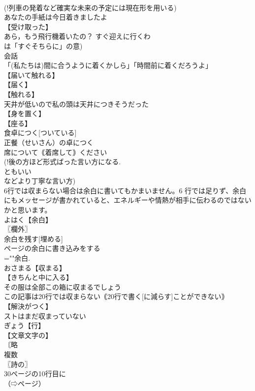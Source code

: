 \documentclass[8pt]{extreport}
\begin{document}
\begin{CJK}{UTF8}{min}
\\	(!列車の発着など確実な未来の予定には現在形を用いる) 
\\	あなたの手紙は今日着きましたよ
\\	【受け取った】
\\	あら，もう飛行機着いたの？ すぐ迎えに行くわ
\\	は「すぐそちらに」の意)
\\	会話
\\	「(私たちは)間に合うように着くかしら」「時間前に着くだろうよ」
\\	【届いて触れる】
\\	【届く】
\\	【触れる】
\\	天井が低いので私の頭は天井につきそうだった
\\	【身を置く】
\\	【座る】
\\	食卓につく[ついている]
\\	正餐（せいさん）の卓につく
\\	席について｟着席して｠ください
\\	(!後の方ほど形式ばった言い方になる. 
\\	ともいい 
\\	などより丁寧な言い方)
\\	6行では収まらない場合は余白に書いてもかまいません。6 行では足りず、余白にもメッセージが書かれていると、エネルギーや情熱が相手に伝わるのではないかと思います。		
\\	よはく【余白】
\\	〖欄外〗
\\	余白を残す[埋める]
\\	ページの余白に書き込みをする
\\	=""余白.
\\	おさまる【収まる】
\\	【きちんと中に入る】
\\	その服は全部この箱に収まるでしょう
\\	この記事は20行では収まらない｟20行で書く[に減らす]ことができない｠
\\	【解決がつく】
\\	ストはまだ収まっていない
\\	ぎょう【行】
\\	【文章文字の】
\\	〘略 
\\	複数
\\	〖詩の〗
\\	30ページの10行目に
\\	（⇨ページ）

\end{CJK}
\end{document}
